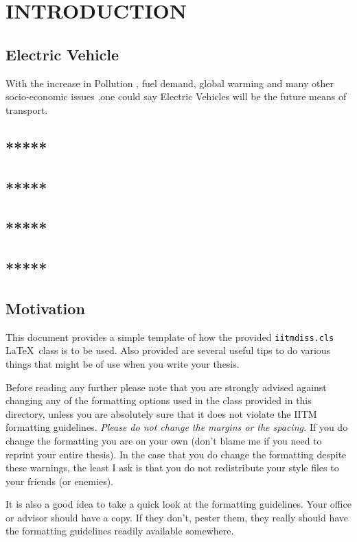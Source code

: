 	\chapter{INTRODUCTION}
	\label{chap:intro}
	
	\section{Electric Vehicle}
	
	With the increase in Pollution , fuel demand, global warming and many other socio-economic issues ,one could say Electric Vehicles will be the future means of transport.
	
	
	\section{*****}
	\section{*****}
	\section{*****}
	\section{*****}
	\section{Motivation}
	This document provides a simple template of how the provided
	\verb+iitmdiss.cls+ \LaTeX\ class is to be used.  Also provided are
	several useful tips to do various things that might be of use when you
	write your thesis.
	
	Before reading any further please note that you are strongly advised
	against changing any of the formatting options used in the class
	provided in this directory, unless you are absolutely sure that it
	does not violate the IITM formatting guidelines.  \emph{Please do not
		change the margins or the spacing.}  If you do change the formatting
	you are on your own (don't blame me if you need to reprint your entire
	thesis).  In the case that you do change the formatting despite these
	warnings, the least I ask is that you do not redistribute your style
	files to your friends (or enemies).
	
	It is also a good idea to take a quick look at the formatting
	guidelines.  Your office or advisor should have a copy.  If they
	don't, pester them, they really should have the formatting guidelines
	readily available somewhere.
	

